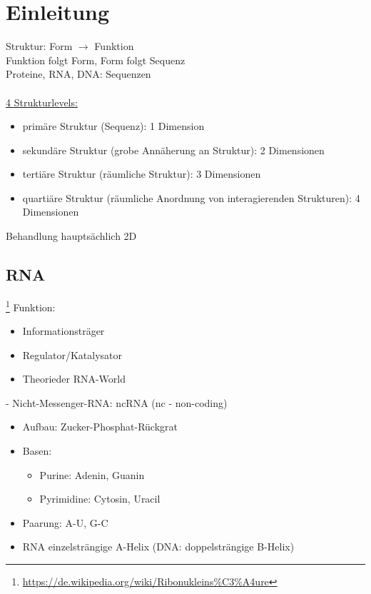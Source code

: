 \section{Einleitung}

Struktur: Form $\rightarrow$ Funktion\\
Funktion folgt Form, Form folgt Sequenz\\
Proteine, RNA, DNA: Sequenzen\\
\\
\underline{4 Strukturlevels:}
\begin{itemize}
	\item primäre Struktur (Sequenz): 1 Dimension
	\item sekundäre Struktur (grobe Annäherung an Struktur): 2 Dimensionen
	\item tertiäre Struktur (räumliche Struktur): 3 Dimensionen
	\item quartiäre Struktur (räumliche Anordnung von interagierenden Strukturen): 4 Dimensionen
\end{itemize}

Behandlung hauptsächlich 2D\\

% 
\subsection{RNA}\footnote{\url{https://de.wikipedia.org/wiki/Ribonukleins\%C3\%A4ure}}
Funktion:
\begin{itemize}
	\item Informationsträger
	\item Regulator/Katalysator
	\item Theorieder RNA-World
\end{itemize}

 - Nicht-Messenger-RNA: ncRNA (nc - non-coding)\\

\begin{itemize}
	\item Aufbau: Zucker-Phosphat-Rückgrat
	\item Basen:
	\begin{itemize}
		\item Purine: Adenin, Guanin
		\item Pyrimidine: Cytosin, Uracil
	\end{itemize}
	\item Paarung: A-U, G-C
	\item RNA einzelsträngige A-Helix (DNA: doppelsträngige B-Helix)
\end{itemize}

